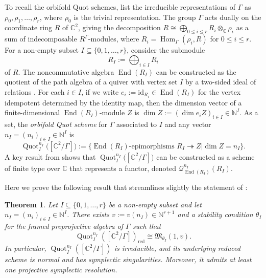 \documentclass[11pt,reqno]{amsart}
\numberwithin{equation}{section}
\newtheorem{theorem}{Theorem}%
\theoremstyle{definition}
\newcommand{\CC}{\ensuremath{\mathbb{C}}}
\newcommand{\kk}{\ensuremath{\Bbbk}}
\newcommand{\NN}{\ensuremath{\mathbb{N}}}
\newcommand{\End}{\operatorname{End}}
\newcommand{\Hom}{\operatorname{Hom}}
\newcommand{\Quot}{\operatorname{Quot}}
\newcommand{\QuotI}[1][ ]{\Quot_I^{#1}}
\newcommand{\QuotInI}{\QuotI[n_I]}
\begin{document}
  To recall the orbifold Quot schemes, list the irreducible representations of $\Gamma$ as $\rho_0, \rho_1,\dots, \rho_r$, where $\rho_0$ is the trivial representation.
  The group $\Gamma$ acts dually on the coordinate ring $R$ of $\mathbb{C}^2$, giving the decomposition $R\cong\bigoplus_{0\leq i\leq r} R_i\otimes_{\CC} \rho_i$ as a sum of indecomposable $R^\Gamma$-modules, where $R_i=\Hom_\Gamma(\rho_i,R)$ for $0\leq i\leq r$. For a non-empty subset $I\subseteq \{0,1,\dots, r\}$, consider the submodule 
  \[
  R_I:=\bigoplus_{i\in I} R_i
  \]
  of $R$. %
  The noncommutative algebra $\End(R_I)$ can be constructed as the quotient of the path algebra of a quiver with vertex set $I$ by a two-sided ideal of relations \cite[(3.5)]{CGGS1}. For each $i\in I$, if we write $e_i:= \text{id}_{R_i}\in \End(R_I)$ for the vertex idempotent determined by the identity map, then the dimension vector of a finite-dimensional $\End(R_I)$-module $Z$ is $\dim Z:=(\dim e_i Z)_{i\in I}\in \NN^I$. As a set, the \emph{orbifold Quot scheme} for $\Gamma$ associated to $I$ and any vector $n_I=(n_i)_{i\in I}\in \mathbb{N}^{I}$ is     
   \[
   \Quot_I^{n_I}\big([\mathbb{C}^2/\Gamma]\big):= \big\{\End(R_I) \text{-epimorphisms } R_I\twoheadrightarrow Z 
   \mathrel{\big|} 
   \dim Z = n_I\big\}.
   \]
   A key result from \cite[Proposition~3.2]{CGGS2} shows that $\Quot_I^{n_I}\big([\mathbb{C}^2/\Gamma]\big)$ can be constructed as a scheme of finite type over $\CC$ that represents a functor, denoted $\mathcal{Q}^{n_I}_{\End(R_I)}(R_I)$. 
   
   Here we prove the following result that streamlines slightly the statement of \cite[Theorem~1.1(3)]{CGGS2}:
  
  \begin{theorem}
\label{thm:main}
 Let $I\subseteq \{0,1,\dots, r\}$ be a non-empty subset and let $n_I=(n_i)_{i\in I}\in \mathbb{N}^{I}$. There exists $v:=v(n_I) \in \mathbb{N}^{r+1}$ and a stability condition $\theta_I$ for the framed preprojective algebra of $\Gamma$ such that 
 \[
\QuotInI ([\mathbb{C}^2/\Gamma])_{\mathrm{red}} \cong  \mathfrak{M}_{\theta_I}(1,v).
\]
 In particular, $\QuotInI ([\mathbb{C}^2/\Gamma])$ is irreducible, and its underlying reduced scheme is normal and has symplectic singularities. Moreover, it admits at least one projective symplectic resolution.
\end{theorem}
\end{document}
